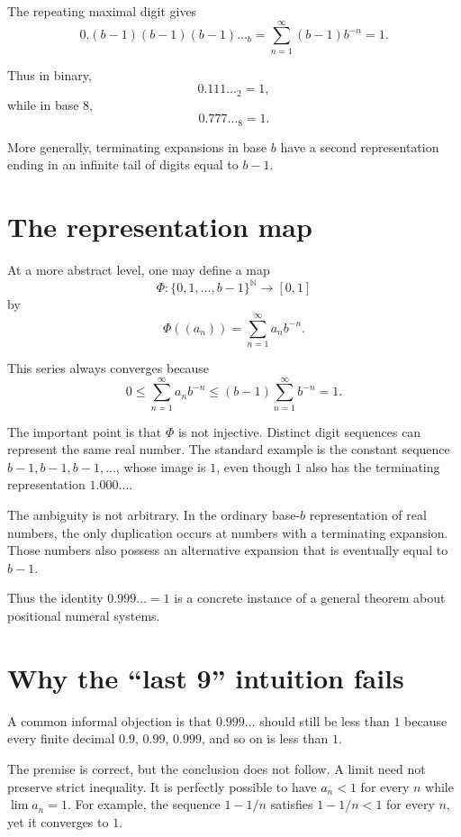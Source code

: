\documentclass{essay}
\begin{document}
The repeating maximal digit gives
\[ 0.(b-1)(b-1)(b-1)\ldots{}_{b} = \sum_{n=1}^{\infty}(b-1)b^{-n} = 1. \]

Thus in binary,
\[ 0.111\ldots_{2}=1, \]
while in base \(8\),
\[ 0.777\ldots_{8}=1. \]

More generally, terminating expansions in base \(b\) have a second representation ending in an infinite tail of digits equal to \(b-1\).

\section{The representation map}

At a more abstract level, one may define a map
\[ \Phi:\{0,1,\ldots,b-1\}^{\mathbb{N}}\longrightarrow[0,1] \]
by
\[ \Phi((a_{n}))=\sum_{n=1}^{\infty}a_{n} b^{-n}. \]

This series always converges because
\[ 0\le \sum_{n=1}^{\infty}a_{n} b^{-n} \le (b-1)\sum_{n=1}^{\infty}b^{-n} = 1. \]

The important point is that \(\Phi\) is not injective. Distinct digit sequences can represent the same real number. The standard example is the constant sequence \(b-1,b-1,b-1,\ldots\), whose image is \(1\), even though \(1\) also has the terminating representation \(1.000\ldots\).

The ambiguity is not arbitrary. In the ordinary base-\(b\) representation of real numbers, the only duplication occurs at numbers with a terminating expansion. Those numbers also possess an alternative expansion that is eventually equal to \(b-1\).

Thus the identity \(0.999\ldots=1\) is a concrete instance of a general theorem about positional numeral systems.

\section{Why the ``last 9'' intuition fails}

A common informal objection is that \(0.999\ldots\) should still be less than \(1\) because every finite decimal \(0.9\), \(0.99\), \(0.999\), and so on is less than \(1\).

The premise is correct, but the conclusion does not follow. A limit need not preserve strict inequality. It is perfectly possible to have \(a_{n}<1\) for every \(n\) while \(\lim a_{n}=1\). For example, the sequence \(1-1/n\) satisfies \(1-1/n<1\) for every \(n\), yet it converges to \(1\).
\end{document}
